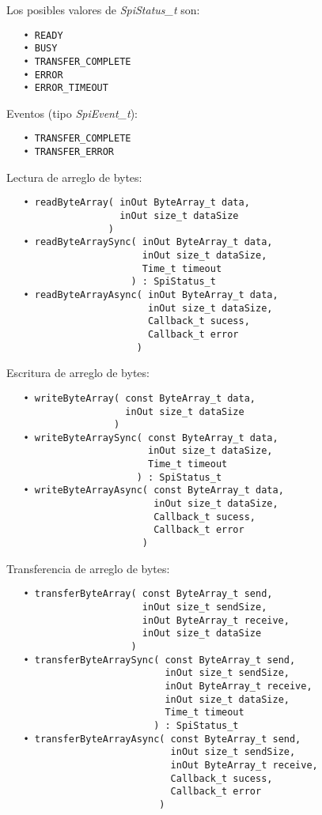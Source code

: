 Los posibles valores de \emph{SpiStatus\_t} son:

\begin{verbatim}
   • READY
   • BUSY
   • TRANSFER_COMPLETE
   • ERROR
   • ERROR_TIMEOUT
\end{verbatim}

Eventos (tipo \emph{SpiEvent\_t}):

\begin{verbatim}
   • TRANSFER_COMPLETE
   • TRANSFER_ERROR
\end{verbatim}



Lectura de arreglo de bytes:

\begin{verbatim}
   • readByteArray( inOut ByteArray_t data,
                    inOut size_t dataSize
                  )
   • readByteArraySync( inOut ByteArray_t data,
                        inOut size_t dataSize,
                        Time_t timeout
                      ) : SpiStatus_t
   • readByteArrayAsync( inOut ByteArray_t data, 
                         inOut size_t dataSize,
                         Callback_t sucess,
                         Callback_t error 
                       )
\end{verbatim}

Escritura de arreglo de bytes:

\begin{verbatim}
   • writeByteArray( const ByteArray_t data,
                     inOut size_t dataSize
                   )
   • writeByteArraySync( const ByteArray_t data,
                         inOut size_t dataSize,
                         Time_t timeout
                       ) : SpiStatus_t
   • writeByteArrayAsync( const ByteArray_t data, 
                          inOut size_t dataSize,
                          Callback_t sucess,
                          Callback_t error 
                        )
\end{verbatim}

Transferencia de arreglo de bytes:

\begin{verbatim}
   • transferByteArray( const ByteArray_t send,
                        inOut size_t sendSize,
                        inOut ByteArray_t receive,
                        inOut size_t dataSize
                      )
   • transferByteArraySync( const ByteArray_t send,
                            inOut size_t sendSize,
                            inOut ByteArray_t receive,
                            inOut size_t dataSize,
                            Time_t timeout
                          ) : SpiStatus_t
   • transferByteArrayAsync( const ByteArray_t send,
                             inOut size_t sendSize,
                             inOut ByteArray_t receive,
                             Callback_t sucess,
                             Callback_t error 
                           )
\end{verbatim}

